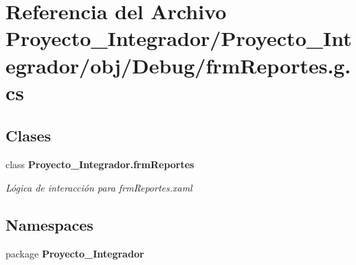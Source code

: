 \section{Referencia del Archivo Proyecto\-\_\-\-Integrador/\-Proyecto\-\_\-\-Integrador/obj/\-Debug/frm\-Reportes.g.\-cs}
\label{frm_reportes_8g_8cs}
\subsection*{Clases}
\begin{DoxyCompactItemize}
\item 
class {\bf Proyecto\-\_\-\-Integrador.\-frm\-Reportes}
\begin{DoxyCompactList}\small\item\em Lógica de interacción para frm\-Reportes.\-xaml \end{DoxyCompactList}\end{DoxyCompactItemize}
\subsection*{Namespaces}
\begin{DoxyCompactItemize}
\item 
package {\bf Proyecto\-\_\-\-Integrador}
\end{DoxyCompactItemize}
